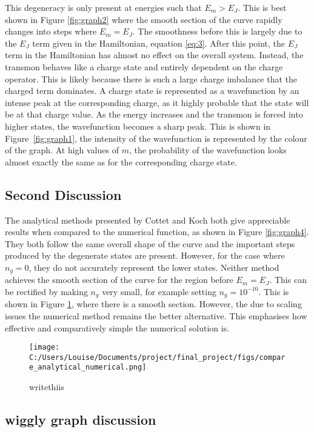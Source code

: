 \documentclass[11pt]{article}
\begin{document}
This degeneracy is only present at energies such that $E_m > E_J$. This is best shown in Figure \ref{fig:graph2} where the smooth section of the curve rapidly changes into steps where $E_m = E_J$. The smoothness before this is largely due to the $E_J$ term given in the Hamiltonian, equation \ref{eq:3}. After this point, the $E_J$ term in the Hamiltonian has almost no effect on the overall system. Instead, the transmon behaves like a charge state and entirely dependent on the charge operator. This is likely because there is such a large charge imbalance that the charged term dominates. A charge state is represented as a wavefunction by an intense peak at the corresponding charge, as it highly probable that the state will be at that charge value. As the energy increases and the transmon is forced into higher states, the wavefunction becomes a sharp peak. This is shown in Figure~\ref{fig:graph1}, the intensity of the wavefunction is represented by the colour of the graph. At high values of $m$, the probability of the wavefunction looks almost exactly the same as for the corresponding charge state.

\subsection{Second Discussion}
The analytical methods presented by Cottet and Koch both give appreciable results when compared to the numerical function, as shown in Figure \ref{fig:graph4}. They both follow the same overall shape of the curve and the important steps produced by the degenerate states are present. However, for the case where $n_g = 0$, they do not accurately represent the lower states. Neither method achieves the smooth section of the curve for the region before $E_m = E_J$. This can be rectified by making $n_g$ very small, for example setting $n_g = 10^{-10}$. This is shown in Figure \ref{fig:graph6}, where there is a smooth section. However, the due to scaling issues the numerical method remains the better alternative. This emphasises how effective and comparatively simple the numerical solution is.
\begin{figure}[!ht]
\centering
\texttt{[image: C:/Users/Louise/Documents/project/final\_project/figs/compare\_analytical\_numerical.png]}
\caption{writethiis}
\label{fig:graph6}
\end{figure}

\subsection{wiggly graph discussion}
\end{document}
